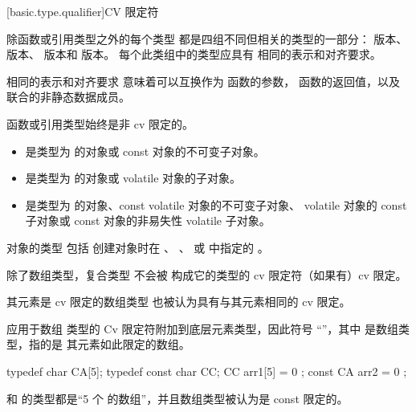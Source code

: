 [basic.type.qualifier]{CV 限定符}

\pnum
{}%
%
%
除函数或引用类型之外的每个类型
都是四组不同但相关的类型的一部分：
 版本、
 版本、
 版本和
 版本。
每个此类组中的类型应具有
相同的表示和对齐要求。
\begin{footnote}
相同的表示和对齐要求
意味着可以互换作为
函数的参数，
函数的返回值，以及
联合的非静态数据成员。
\end{footnote}
函数或引用类型始终是非 cv 限定的。
\begin{itemize}
\item {} 是类型为  的对象或
  const 对象的不可变子对象。

\item {} 是类型为
   的对象或 volatile 对象的子对象。

\item {} 是类型为
   的对象、const volatile 对象的不可变子对象、
  volatile 对象的 const 子对象或 const 对象的非易失性
  volatile 子对象。
\end{itemize}
\begin{note}
对象的类型 包括
创建对象时在
、
、
 或
中指定的 。
\end{note}

\pnum
除了数组类型，复合类型 不会被
构成它的类型的 cv 限定符（如果有）cv 限定。

\pnum
{}%
其元素是 cv 限定的数组类型
也被认为具有与其元素相同的 cv 限定。
\begin{note}
应用于数组
类型的 Cv 限定符附加到底层元素类型，因此符号
“\cv {}”，其中  是数组类型，指的是
其元素如此限定的数组。
\end{note}
\begin{example}
\begin{codeblock}
typedef char CA[5];
typedef const char CC;
CC arr1[5] = { 0 };
const CA arr2 = { 0 };
\end{codeblock}
 和  的类型都是“5 个
 的数组”，并且数组类型被认为是
const 限定的。
\end{example}

